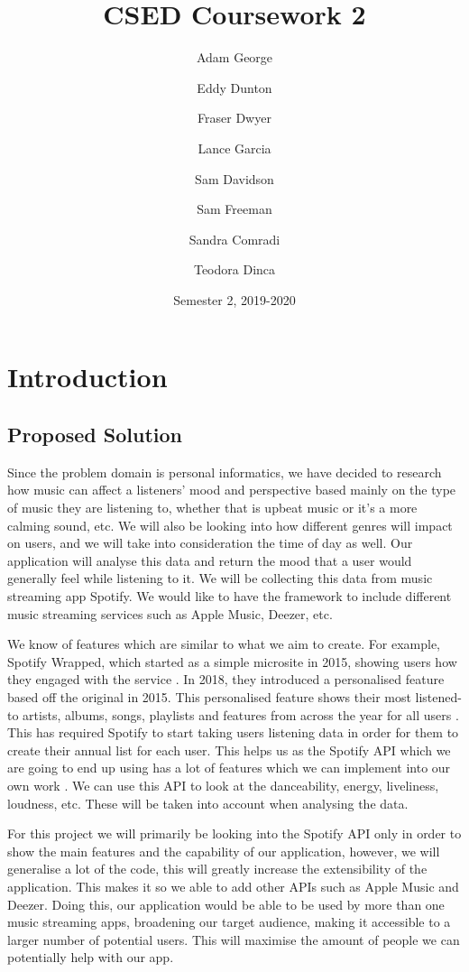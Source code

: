 \documentclass[12pt]{report}
\title{CSED Coursework 2}
\author{
	Adam George
	\and
	Eddy Dunton
	\and
	Fraser Dwyer
	\and	
	Lance Garcia
	\and
	Sam Davidson
	\and
	Sam Freeman
	\and
	Sandra Comradi
	\and
	Teodora Dinca
}
\date{Semester 2,  2019-2020}
\begin{document}
\begin{titlepage}
\maketitle
\end{titlepage}

\tableofcontents

\chapter{Introduction}

\section{Proposed Solution}

Since the problem domain is personal informatics, we have decided to research how music can affect a listeners' mood and perspective based mainly on the type of music they are listening to, whether that is upbeat music or it’s a more calming sound, etc. We will also be looking into how different genres will impact on users, and we will take into consideration the time of day as well. Our application will analyse this data and return the mood that a user would generally feel while listening to it. We will be collecting this data from music streaming app Spotify. We would like to have the framework to include different music streaming services such as Apple Music, Deezer, etc.

We know of features which are similar to what we aim to create. For example, Spotify Wrapped, which started as a simple microsite in 2015, showing users how they engaged with the service \cite{Swant}. In 2018, they introduced a personalised feature based off the original in 2015. This personalised feature shows their most listened-to artists, albums, songs, playlists and features from across the year for all users \cite{Somerville}. This has required Spotify to start taking users listening data in order for them to create their annual list for each user. This helps us as the Spotify API which we are going to end up using has a lot of features which we can implement into our own work \cite{WebAPI}. We can use this API to look at the danceability, energy, liveliness, loudness, etc. These will be taken into account when analysing the data.

For this project we will primarily be looking into the Spotify API only in order to show the main features and the capability of our application, however, we will generalise a lot of the code, this will greatly increase the extensibility of the application. This makes it so we able to add other APIs such as Apple Music and Deezer. Doing this, our application would be able to be used by more than one music streaming apps, broadening our target audience, making it accessible to a larger number of potential users. This will maximise the amount of people we can potentially help with our app.
\end{document}
